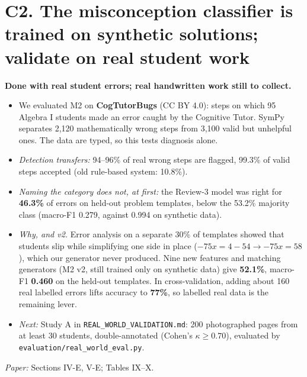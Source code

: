 \documentclass[10pt]{article}
\begin{document}
\section*{C2. The misconception classifier is trained on synthetic solutions; validate on real student work}
\textbf{Done with real student errors; real handwritten work still to collect.}
\begin{itemize}
\item We evaluated M2 on \textbf{CogTutorBugs} (CC BY 4.0): steps on which 95 Algebra I students
made an error caught by the Cognitive Tutor. SymPy separates 2,120 mathematically wrong steps from
3,100 valid but unhelpful ones. The data are typed, so this tests diagnosis alone.
\item \textit{Detection transfers:} 94--96\% of real wrong steps are flagged, 99.3\% of valid steps
accepted (old rule-based system: 10.8\%).
\item \textit{Naming the category does not, at first:} the Review-3 model was right for
\textbf{46.3\%} of errors on held-out problem templates, below the 53.2\% majority class (macro-F1
0.279, against 0.994 on synthetic data).
\item \textit{Why, and v2.} Error analysis on a separate 30\% of templates showed that students slip
while simplifying one side in place ($-75x=4-54 \rightarrow -75x=58$), which our generator never
produced. Nine new features and matching generators (M2 v2, still trained only on synthetic data)
give \textbf{52.1\%}, macro-F1 \textbf{0.460} on the held-out templates. In cross-validation,
adding about 160 real labelled errors lifts accuracy to \textbf{77\%}, so labelled real data is the
remaining lever.
\item \textit{Next:} Study A in \texttt{REAL\_WORLD\_VALIDATION.md}: 200 photographed pages from at
least 30 students, double-annotated (Cohen's $\kappa \ge 0.70$), evaluated by
\texttt{evaluation/real\_world\_eval.py}.
\end{itemize}
\textit{Paper:} Sections IV-E, V-E; Tables IX--X.
\end{document}
